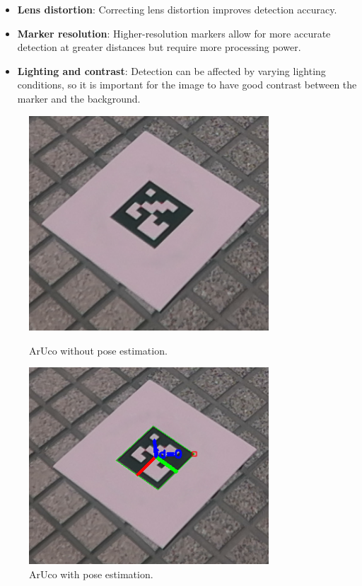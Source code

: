     \begin{itemize}
        \item \textbf{Lens distortion}: Correcting lens distortion improves detection accuracy.
        \item \textbf{Marker resolution}: Higher-resolution markers allow for more accurate detection at greater distances but require more processing power.
        \item \textbf{Lighting and contrast}: Detection can be affected by varying lighting conditions, so it is important for the image to have good contrast between the marker and the background.
    \end{itemize}

    \begin{figure}[h!] 
        \centering 
            \begin{minipage}{0.48\textwidth}
                \includegraphics[width=0.8\textwidth]{pictures/aruco_no_pose_estimation.png} %
                \caption{ArUco without pose estimation.} 
                \label{fig:aruco_no_pose_estimation}
            \end{minipage}
            \begin{minipage}{0.48\textwidth}
                \includegraphics[width=0.8\textwidth]{pictures/aruco_pose_estimation.png} %
                \caption{ArUco with pose estimation.} 
                \label{fig:aruco_pose_estimation}
            \end{minipage}
    \end{figure}

